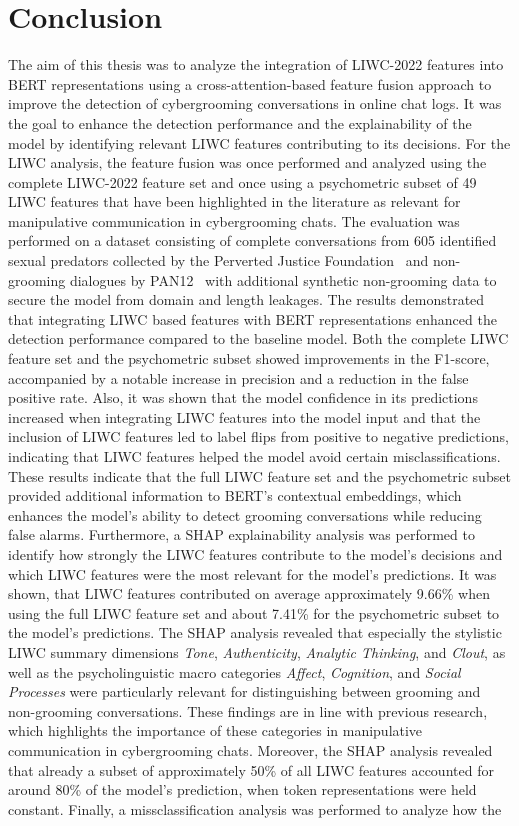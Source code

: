 \chapter{Conclusion}
The aim of this thesis was to analyze the integration of LIWC-2022 features into BERT representations using a cross-attention-based feature fusion approach to improve the detection of cybergrooming conversations in online chat logs. It was the goal to enhance the detection performance and the explainability of the model by identifying relevant LIWC features contributing to its decisions. For the LIWC analysis, the feature fusion was once performed and analyzed using the complete LIWC-2022 feature set and once using a psychometric subset of 49 LIWC features that have been highlighted in the literature as relevant for manipulative communication in cybergrooming chats. The evaluation was performed on a dataset consisting of complete conversations from 605 identified sexual predators collected by the Perverted Justice Foundation~\cite{pj} and non-grooming dialogues by PAN12~\cite{inches2012pan} with additional synthetic non-grooming data to secure the model from domain and length leakages. The results demonstrated that integrating LIWC based features with BERT representations enhanced the detection performance compared to the baseline model. Both the complete LIWC feature set and the psychometric subset showed improvements in the F1-score, accompanied by a notable increase in precision and a reduction in the false positive rate. Also, it was shown that the model confidence in its predictions increased when integrating LIWC features into the model input and that the inclusion of LIWC features led to label flips from positive to negative predictions, indicating that LIWC features helped the model avoid certain misclassifications. These results indicate that the full LIWC feature set and the psychometric subset provided additional information to BERT's contextual embeddings, which enhances the model's ability to detect grooming conversations while reducing false alarms. Furthermore, a SHAP explainability analysis was performed to identify how strongly the LIWC features contribute to the model's decisions and which LIWC features were the most relevant for the model's predictions. It was shown, that LIWC features contributed on average approximately 9.66\% when using the full LIWC feature set and about 7.41\% for the psychometric subset to the model’s predictions. The SHAP analysis revealed that especially the stylistic LIWC summary dimensions \textit{Tone}, \textit{Authenticity}, \textit{Analytic Thinking}, and \textit{Clout}, as well as the psycholinguistic macro categories \textit{Affect}, \textit{Cognition}, and \textit{Social Processes} were particularly relevant for distinguishing between grooming and non-grooming conversations. These findings are in line with previous research, which highlights the importance of these categories in manipulative communication in cybergrooming chats. Moreover, the SHAP analysis revealed that already a subset of approximately 50\% of all LIWC features accounted for around 80\% of the model’s prediction, when token representations were held constant. Finally, a missclassification analysis was performed to analyze how the 